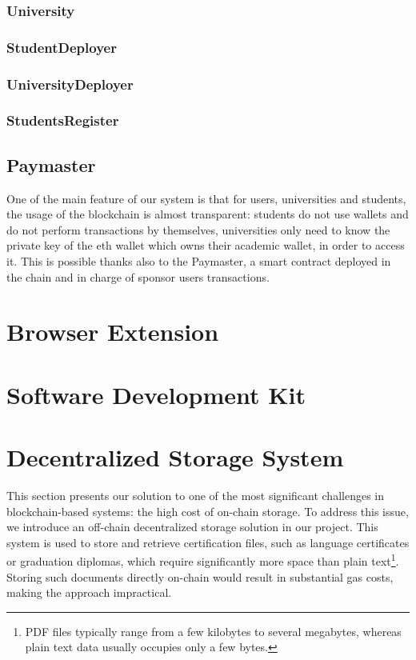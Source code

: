 \subsubsection{University}

\subsubsection{StudentDeployer}

\subsubsection{UniversityDeployer}

\subsubsection{StudentsRegister}

\subsection{Paymaster}
One of the main feature of our system is that for users, universities and students, the usage of the blockchain is almost transparent: students do not use wallets and do not perform transactions by themselves, universities only need to know the private key of the \acrlong{eth} wallet which owns their academic wallet, in order to access it. This is possible thanks also to the Paymaster, a smart contract deployed in the chain and in charge of sponsor users transactions.

\section{Browser Extension}
\label{sec:browserExtensionDesign}

\section{Software Development Kit}
\label{sec:sdkDesign}

\section{Decentralized Storage System}
\label{sec:decStorageDesgn}
This section presents our solution to one of the most significant challenges in blockchain-based systems: the high cost of on-chain storage. To address this issue, we introduce an off-chain decentralized storage solution in our project. This system is used to store and retrieve certification files, such as language certificates or graduation diplomas, which require significantly more space than plain text\footnote{PDF files typically range from a few kilobytes to several megabytes, whereas plain text data usually occupies only a few bytes.}. Storing such documents directly on-chain would result in substantial gas costs, making the approach impractical. 

